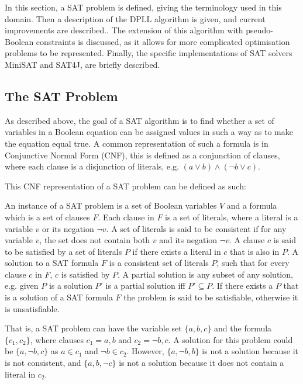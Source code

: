 In this section, a SAT problem is defined, giving the terminology used in this domain. 
Then a description of the DPLL algorithm is given, and current improvements are described..
The extension of this algorithm with pseudo-Boolean constraints is discussed, as it allows for more complicated optimisation problems to be represented.
Finally, the specific implementations of SAT solvers MiniSAT \citep{een2003} and SAT4J\citep{le2010sat4j}, are briefly described.

\subsection{The SAT Problem}
As described above, the goal of a SAT algorithm is to find whether a set of variables in a Boolean equation can be assigned values in such a way as to make the equation equal true.
A common representation of such a formula is in Conjunctive Normal Form (CNF), this is defined as a conjunction of clauses, 
where each clause is a disjunction of literals, e.g. $(a \vee b) \wedge (\neg b \vee c)$.

This CNF representation of a SAT problem can be defined as such:
\begin{defs}
An instance of a SAT problem is a set of Boolean variables $V$ and a formula which is a set of clauses $F$.
Each clause in $F$ is a set of literals, where a literal is a variable $v$ or its negation $\neg v$.
A set of literals is said to be consistent if for any variable $v$, the set does not contain both $v$ and its negation $\neg v$.
A clause $c$ is said to be satisfied by a set of literals $P$ if there exists a literal in $c$ that is also in $P$.
A solution to a SAT formula $F$ is a consistent set of literals $P$, such that for every clause $c$ in $F$, $c$ is satisfied by $P$.
A partial solution is any subset of any solution, e.g. given $P$ is a solution $P'$ is a partial solution iff $P' \subseteq P$.
If there exists a $P$ that is a solution of a SAT formula $F$ the problem is said to be satisfiable, otherwise it is unsatisfiable. 
\end{defs}

That is, a SAT problem can have the variable set $\{a,b,c\}$ and the formula $\{c_1,c_2\}$, where clauses $c_1 = {a,b}$ and $c_2 = {\neg b, c}$.
A solution for this problem could be $\{a,\neg b,c\}$ as $a \in c_1$ and $\neg b \in c_2$.
However, $\{a, \neg b, b\}$ is not a solution because it is not consistent, and $\{a, b, \neg c\}$ is not a solution because it does not contain a literal in $c_2$.  

